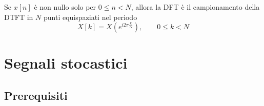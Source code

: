         \begin{property}
            Se $x[n]$ è non nullo solo per $0 \leq n < N$, allora la DFT è il campionamento della DTFT in $N$ punti equispaziati nel periodo
            \[
                X[k] = X(e^{i 2 \pi \frac{k}{N}}), \qquad 0 \leq k < N
            \]
        \end{property}

\clearpage
\section{Segnali stocastici}
    \subsection{Prerequisiti}
        \begin{definition}
        \end{definition}

        \begin{definition}
        \end{definition}

        \begin{definition}[Spazio $L^2(\Omega, \mathcal{F}, P)$]
        \end{definition}

        \begin{definition}
        \end{definition}

        \begin{definition}[Norma]
        \end{definition}

        \begin{theorem}
        \end{theorem}

        \begin{property}
        \end{property}

        \begin{definition}
        \end{definition}

